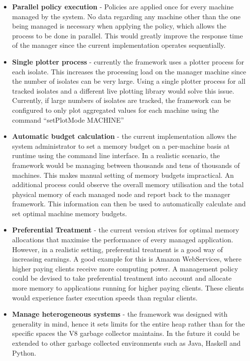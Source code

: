 \documentclass{l4proj}
\begin{document}
\begin{itemize}

\item \textbf{Parallel policy execution} - Policies are applied once for every machine managed by the system. No data regarding any machine other than the one being managed is necessary when applying the policy, which allows the process to be done in parallel. This would greatly improve the response time of the manager since the current implementation operates sequentially.

\item \textbf{Single plotter process} - currently the framework uses a plotter process for each isolate. This increases the processing load on the manager machine since the number of isolates can be very large. Using a single plotter process for all tracked isolates and a different live plotting library would solve this issue. Currently, if large numbers of isolates are tracked, the framework can be configured to only plot aggregated values for each machine using the command ``setPlotMode MACHINE''

\item \textbf{Automatic budget calculation} - the current implementation allows the system administrator to set a memory budget on a per-machine basis at runtime using the command line interface. In a realistic scenario, the framework would be managing between thousands and tens of thousands of machines. This makes manual setting of memory budgets impractical. An additional process could observe the overall memory utilisation and the total physical memory of each managed node and report back to the manager framework. This information can then be used to automatically calculate and set optimal machine memory budgets.

\item \textbf{Preferential Treatment} - the current version strives for optimal memory allocations that maximise the performance of every managed application. However, in a realistic setting, preferential treatment is a good way of increasing earnings. A good example for this is Amazon WebServices, where higher paying clients receive more computing power. A management policy could be devised to take preferential treatment into account and allocate more memory to applications running for higher paying clients. These clients would experience faster execution speeds than regular clients.

\item \textbf{Manage heterogeneous systems} - the framework was designed with generality in mind, hence it sets limits for the entire heap rather than for the specific spaces the V8 garbage collector maintains. In the future it could be extended to other garbage collected environments such as Java, Haskell and Python. 
\end{itemize}
\end{document}
